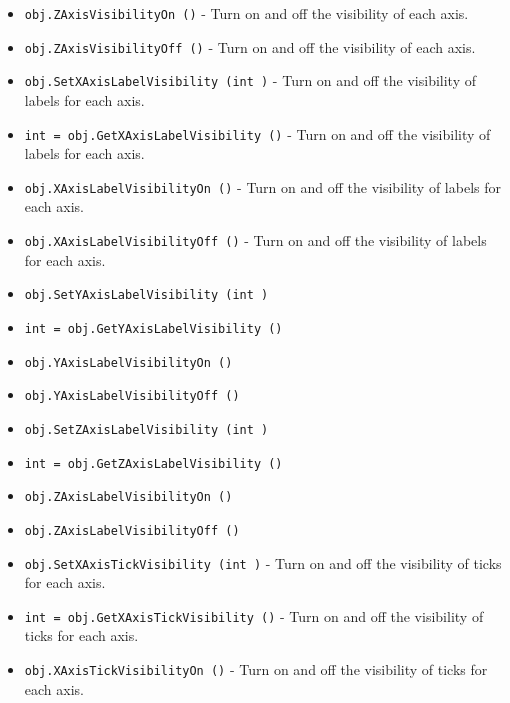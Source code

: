 \begin{itemize}
\item  \verb|obj.ZAxisVisibilityOn ()| -  Turn on and off the visibility of each axis.

\item  \verb|obj.ZAxisVisibilityOff ()| -  Turn on and off the visibility of each axis.

\item  \verb|obj.SetXAxisLabelVisibility (int )| -  Turn on and off the visibility of labels for each axis.

\item  \verb|int = obj.GetXAxisLabelVisibility ()| -  Turn on and off the visibility of labels for each axis.

\item  \verb|obj.XAxisLabelVisibilityOn ()| -  Turn on and off the visibility of labels for each axis.

\item  \verb|obj.XAxisLabelVisibilityOff ()| -  Turn on and off the visibility of labels for each axis.

\item  \verb|obj.SetYAxisLabelVisibility (int )|

\item  \verb|int = obj.GetYAxisLabelVisibility ()|

\item  \verb|obj.YAxisLabelVisibilityOn ()|

\item  \verb|obj.YAxisLabelVisibilityOff ()|

\item  \verb|obj.SetZAxisLabelVisibility (int )|

\item  \verb|int = obj.GetZAxisLabelVisibility ()|

\item  \verb|obj.ZAxisLabelVisibilityOn ()|

\item  \verb|obj.ZAxisLabelVisibilityOff ()|

\item  \verb|obj.SetXAxisTickVisibility (int )| -  Turn on and off the visibility of ticks for each axis.

\item  \verb|int = obj.GetXAxisTickVisibility ()| -  Turn on and off the visibility of ticks for each axis.

\item  \verb|obj.XAxisTickVisibilityOn ()| -  Turn on and off the visibility of ticks for each axis.


\end{itemize}
